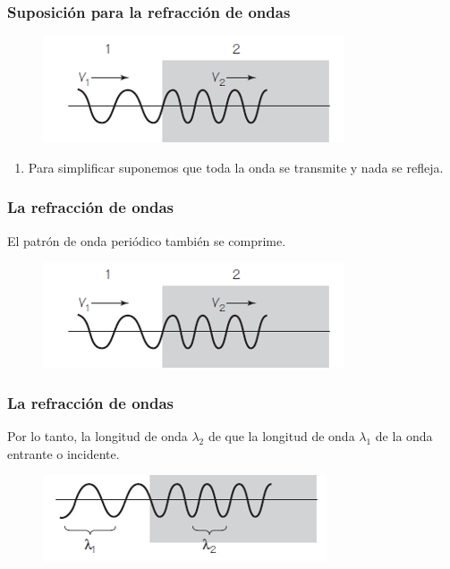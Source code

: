 \documentclass[14pt]{beamer}
\begin{document}
\begin{frame}
\frametitle{Suposición para la refracción de ondas}    
\begin{figure}
    \centering
    \includegraphics[scale=1]{Imagenes/Refraccion_Ondas_02.png}
\end{figure}
\begin{enumerate}[<+->]    
\conti
\item Para simplificar suponemos que toda la onda se transmite y nada se refleja.
\end{enumerate}
\end{frame}
\begin{frame}
\frametitle{La refracción de ondas}
El patrón de onda periódico también se comprime.
\begin{figure}
    \centering
    \includegraphics[scale=1]{Imagenes/Refraccion_Ondas_02.png}
\end{figure}
\end{frame}
\begin{frame}
\frametitle{La refracción de ondas}
Por lo tanto, la longitud de onda $\lambda_{2}$ de  que la longitud de onda $\lambda_{1}$ de la onda entrante o incidente.
\begin{figure}
    \centering
    \includegraphics[scale=1]{Imagenes/Refraccion_Ondas_03.png}
\end{figure}
\end{frame}
\end{document}
